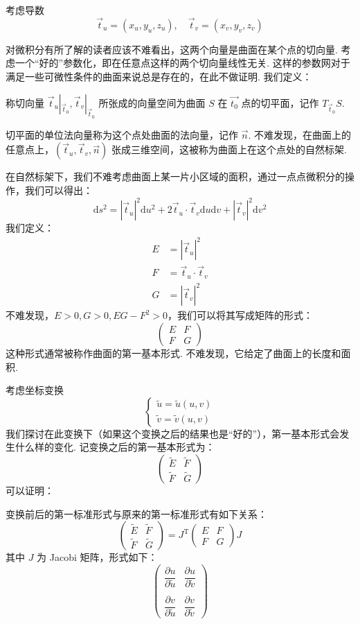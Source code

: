 考虑导数
\[
\vec{t}_u = (x_{u}, y_{u}, z_{u}), \quad \vec{t}_v = (x_{v}, y_{v}, z_{v})
\]

对微积分有所了解的读者应该不难看出，这两个向量是曲面在某个点的切向量. 考虑一个``好的''参数化，即在任意点这样的两个切向量线性无关. 这样的参数网对于满足一些可微性条件的曲面来说总是存在的，在此不做证明. 我们定义：
\begin{definition}
    称切向量 $\vec{t}_u |_{\vec{t}_0}, \vec{t}_v |_{\vec{t}_0}$ 所张成的向量空间为曲面 $S$ 在 $\vec{t_0}$ 点的切平面，记作 $T_{\vec{t}_0} S$.
\end{definition}
切平面的单位法向量称为这个点处曲面的法向量，记作 $\vec{n}$. 不难发现，在曲面上的任意点上，$(\vec{t}_u, \vec{t}_v, \vec{n})$ 张成三维空间，这被称为曲面上在这个点处的自然标架.

在自然标架下，我们不难考虑曲面上某一片小区域的面积，通过一点点微积分的操作，我们可以得出：
\[
\mathrm{d} s^2 = |\vec{t}_u|^2 \mathrm{d} u^2 + 2 \vec{t}_u \cdot \vec{t}_v \mathrm{d} u \mathrm{d} v + |\vec{t}_v|^2 \mathrm{d} v^2
\]
我们定义：
\begin{align*}
    E &= |\vec{t}_u|^2 \\
    F &= \vec{t}_u \cdot \vec{t}_v \\
    G &= |\vec{t}_v|^2
\end{align*}
不难发现，$E > 0, G > 0, E G - F^2 > 0$，我们可以将其写成矩阵的形式：
\[
\begin{pmatrix}
    E & F \\
    F & G
\end{pmatrix}
\]
这种形式通常被称作曲面的第一基本形式. 不难发现，它给定了曲面上的长度和面积.

考虑坐标变换
\[
\begin{cases}
    \tilde{u} = \tilde{u}(u, v) \\
    \tilde{v} = \tilde{v}(u, v)
\end{cases}
\]
我们探讨在此变换下（如果这个变换之后的结果也是``好的''），第一基本形式会发生什么样的变化. 记变换之后的第一基本形式为：
\[
\begin{pmatrix}
    \tilde{E} & \tilde{F} \\
    \tilde{F} & \tilde{G}
\end{pmatrix}
\]
可以证明：
\begin{theorem}{}{}
    变换前后的第一标准形式与原来的第一标准形式有如下关系：
    \[
    \begin{pmatrix}
        \tilde{E} & \tilde{F} \\
        \tilde{F} & \tilde{G}
    \end{pmatrix}
     =
    J^\mathrm{T} \begin{pmatrix}
        E & F \\
        F & G
    \end{pmatrix} J
    \]
    其中 $J$ 为 Jacobi 矩阵，形式如下：
    \[
    \begin{pmatrix}
        \dfrac{\partial u}{\partial \tilde{u}} & \dfrac{\partial u}{\partial \tilde{v}} \\ \\
        \dfrac{\partial v}{\partial \tilde{u}} &
        \dfrac{\partial v}{\partial \tilde{v}}
    \end{pmatrix}
    \]
\end{theorem}

